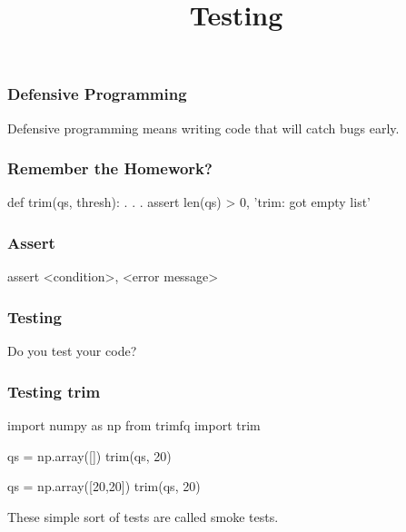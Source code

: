 
\title{Testing}
\usepackage{pgfpages}


\frame{\maketitle}

\begin{frame}[fragile]
\frametitle{Defensive Programming}

Defensive programming means writing code that will catch bugs early.
\end{frame}

\begin{frame}[fragile]
\frametitle{Remember the Homework?}

\begin{python}
def trim(qs, thresh):
    . . .
    assert len(qs) > 0, 'trim: got empty list'
\end{python}
\end{frame}

\begin{frame}[fragile]
\frametitle{Assert}
\begin{python}
assert <condition>, <error message>
\end{python}

\end{frame}

\begin{frame}[fragile]
\frametitle{Testing}

Do you test your code?

\end{frame}

\begin{frame}[fragile]
\frametitle{Testing trim}
\begin{python}


import numpy as np
from trimfq import trim

qs = np.array([])
trim(qs, 20)

qs = np.array([20,20])
trim(qs, 20)
\end{python}

\pause
These simple sort of tests are called \alert{smoke tests}.
\end{frame}

